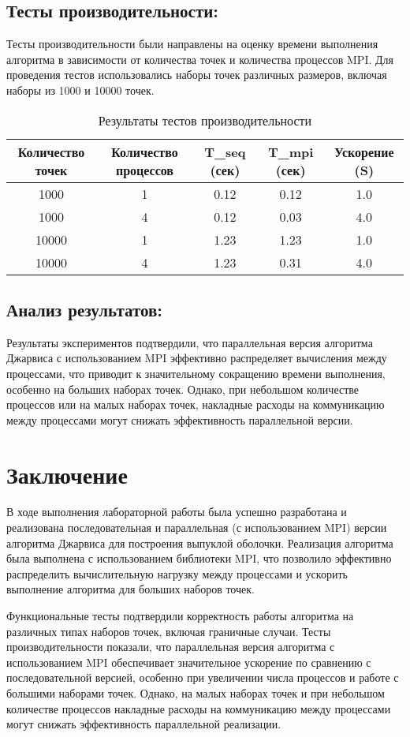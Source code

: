 \documentclass[12pt]{article}
\begin{document}
\subsection*{Тесты производительности:}
Тесты производительности были направлены на оценку времени выполнения алгоритма в зависимости от количества точек и количества процессов MPI. Для проведения тестов использовались наборы точек различных размеров, включая наборы из 1000 и 10000 точек.

\begin{table}[h!]
\centering
\begin{tabular}{|c|c|c|c|c|}
\hline
\textbf{Количество точек} & \textbf{Количество процессов} & \textbf{T\_seq (сек)} & \textbf{T\_mpi (сек)} & \textbf{Ускорение (S)} \\
\hline
1000 & 1 & 0.12 & 0.12 & 1.0 \\
1000 & 4 & 0.12 & 0.03 & 4.0 \\
10000 & 1 & 1.23 & 1.23 & 1.0 \\
10000 & 4 & 1.23 & 0.31 & 4.0 \\
\hline
\end{tabular}
\caption{Результаты тестов производительности}
\end{table}

\subsection*{Анализ результатов:}
Результаты экспериментов подтвердили, что параллельная версия алгоритма Джарвиса с использованием MPI эффективно распределяет вычисления между процессами, что приводит к значительному сокращению времени выполнения, особенно на больших наборах точек. Однако, при небольшом количестве процессов или на малых наборах точек, накладные расходы на коммуникацию между процессами могут снижать эффективность параллельной версии.

\section*{Заключение}
В ходе выполнения лабораторной работы была успешно разработана и реализована последовательная и параллельная (с использованием MPI) версии алгоритма Джарвиса для построения выпуклой оболочки. Реализация алгоритма была выполнена с использованием библиотеки MPI, что позволило эффективно распределить вычислительную нагрузку между процессами и ускорить выполнение алгоритма для больших наборов точек.

Функциональные тесты подтвердили корректность работы алгоритма на различных типах наборов точек, включая граничные случаи. Тесты производительности показали, что параллельная версия алгоритма с использованием MPI обеспечивает значительное ускорение по сравнению с последовательной версией, особенно при увеличении числа процессов и работе с большими наборами точек. Однако, на малых наборах точек и при небольшом количестве процессов накладные расходы на коммуникацию между процессами могут снижать эффективность параллельной реализации.
\end{document}
